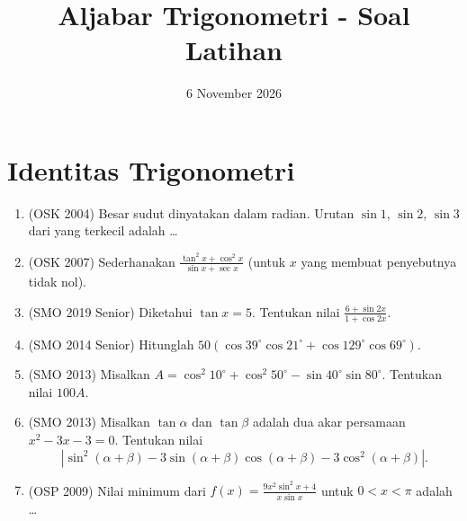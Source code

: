 \documentclass[12pt]{scrartcl}
\title{Aljabar Trigonometri - Soal Latihan}
\date{6 November 2026}
\begin{document}
\maketitle

\renewcommand*\contentsname{Daftar Isi}
\tableofcontents

\newpage

\section{Identitas Trigonometri}

\begin{enumerate}

	\item (OSK 2004)
	Besar sudut dinyatakan dalam radian. Urutan $\sin 1$, $\sin 2$, $\sin 3$
	dari yang terkecil adalah \dots

	\item (OSK 2007)
	Sederhanakan $\frac{\tan^{2}x+\cos^{2}x}{\sin x+\sec x}$
	(untuk $x$ yang membuat penyebutnya tidak nol).

	\item (SMO 2019 Senior)
	Diketahui $\tan x = 5$. Tentukan nilai $\frac{6+\sin 2x}{1+\cos 2x}$.

	\item (SMO 2014 Senior)
	Hitunglah $50(\cos 39^{\circ}\cos 21^{\circ}
	+ \cos 129^{\circ}\cos 69^{\circ})$.

	\item (SMO 2013)
	Misalkan $A = \cos^2 10^{\circ} + \cos^2 50^{\circ}
	- \sin 40^{\circ}\sin 80^{\circ}$. Tentukan nilai $100A$.

	\item (SMO 2013)
	Misalkan $\tan\alpha$ dan $\tan\beta$ adalah dua akar persamaan
	$x^2-3x-3 = 0$. Tentukan nilai
	\[ \left|\sin^2(\alpha+\beta) - 3\sin(\alpha+\beta)\cos(\alpha+\beta)
	- 3\cos^2(\alpha+\beta)\right|. \]

	\item (OSP 2009)
	Nilai minimum dari $f(x) = \frac{9x^{2}\sin^{2}x + 4}{x\sin x}$
	untuk $0 < x < \pi$ adalah \dots


\end{enumerate}
\end{document}
